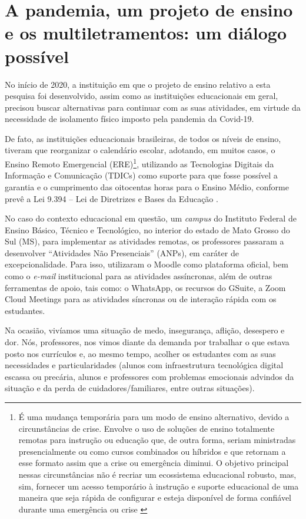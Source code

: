 \section{A pandemia, um projeto de ensino e os multiletramentos: um diálogo possível}\label{sec-apandemia,umprojetode}
No início de 2020, a instituição em que o projeto de ensino relativo a esta pesquisa foi desenvolvido, assim como as instituições educacionais em geral, precisou buscar alternativas para continuar com as suas atividades, em virtude da necessidade de isolamento físico imposto pela pandemia da Covid-19.

De fato, as instituições educacionais brasileiras, de todos os níveis de ensino, tiveram que reorganizar o calendário escolar, adotando, em muitos casos, o Ensino Remoto Emergencial (ERE)\footnote{ É uma mudança temporária para um modo de ensino alternativo, devido a circunstâncias de crise. Envolve o uso de soluções de ensino totalmente remotas para instrução ou educação que, de outra forma, seriam ministradas presencialmente ou como cursos combinados ou híbridos e que retornam a esse formato assim que a crise ou emergência diminui. O objetivo principal nessas circunstâncias não é recriar um ecossistema educacional robusto, mas, sim, fornecer um acesso temporário à instrução e suporte educacional de uma maneira que seja rápida de configurar e esteja disponível de forma confiável durante uma emergência ou crise \cite{hodges_difference_2020}}, utilizando as Tecnologias Digitais da Informação e Comunicação (TDICs) como suporte para que fosse possível a garantia e o cumprimento das oitocentas horas para o Ensino Médio, conforme prevê a Lei 9.394 – Lei de Diretrizes e Bases da Educação \cite{brasil_lei_1996}.

No caso do contexto educacional em questão, um \textit{campus} do Instituto Federal de Ensino Básico, Técnico e Tecnológico, no interior do estado de Mato Grosso do Sul (MS), para implementar as atividades remotas, os professores passaram a desenvolver “Atividades Não Presenciais” (ANPs), em caráter de excepcionalidade. Para isso, utilizaram o Moodle como plataforma oficial, bem como o \textit{e-mail} institucional para as atividades assíncronas, além de outras ferramentas de apoio, tais como: o WhatsApp, os recursos do GSuite, a Zoom Cloud Meetings para as atividades síncronas ou de interação rápida com os estudantes.

Na ocasião, vivíamos uma situação de medo, insegurança, aflição, desespero e dor. Nós, professores, nos vimos diante da demanda por trabalhar o que estava posto nos currículos e, ao mesmo tempo, acolher os estudantes com as suas necessidades e particularidades (alunos com infraestrutura tecnológica digital escassa ou precária, alunos e professores com problemas emocionais advindos da situação e da perda de cuidadores/familiares, entre outras situações).

